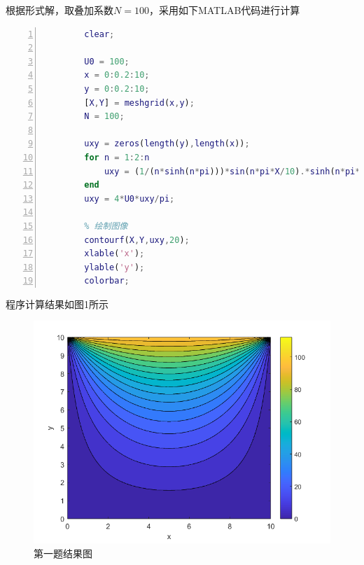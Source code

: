 \documentclass[12pt]{ctexart}
\begin{document}
    \newpage
    根据形式解，取叠加系数$N=100$，采用如下MATLAB代码进行计算
        \begin{lstlisting}[language = Matlab,title={test4\_script.m},  numbers=left, 
            numberstyle=\tiny,keywordstyle=\color{blue!70},
            commentstyle=\color{red!50!green!50!blue!50},frame=shadowbox,
            rulesepcolor=\color{red!20!green!20!blue!20},basicstyle=\ttfamily]
        % 分离变量法求解位势方程图示
        clear;

        U0 = 100;
        x = 0:0.2:10;
        y = 0:0.2:10;
        [X,Y] = meshgrid(x,y);
        N = 100;

        uxy = zeros(length(y),length(x));
        for n = 1:2:n
            uxy = (1/(n*sinh(n*pi)))*sin(n*pi*X/10).*sinh(n*pi*Y/10)+uxy;
        end
        uxy = 4*U0*uxy/pi;

        % 绘制图像
        contourf(X,Y,uxy,20);
        xlable('x');
        ylable('y');
        colorbar;
        \end{lstlisting}
        程序计算结果如图1所示 
        \begin{figure}[htbp]
            \small
            \centering
            \includegraphics[width=16cm]{fig1.png}
            \caption{第一题结果图} \label{Fig:aa}
        \end{figure}
\end{document}
